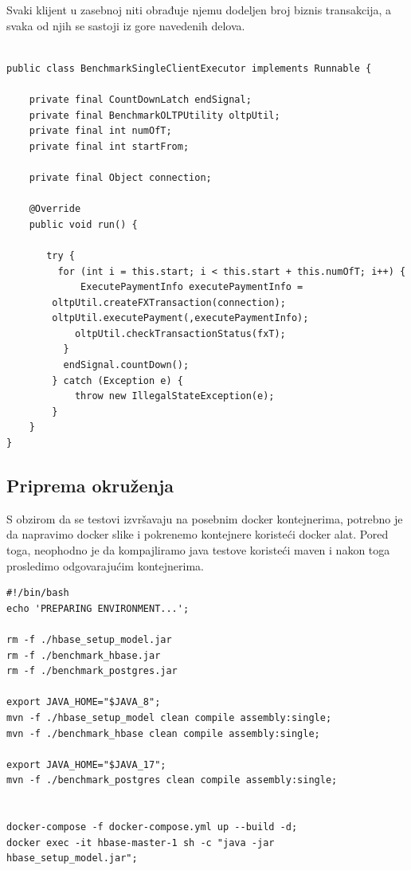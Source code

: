 \documentclass[12pt,oneside]{memoir}
\begin{document}
Svaki klijent u zasebnoj niti obrađuje njemu dodeljen broj biznis transakcija, a svaka od njih se sastoji iz gore navedenih delova.


\begin{lstlisting}[title={BenchmarkSingleClientExecutor.java},captionpos=t]

public class BenchmarkSingleClientExecutor implements Runnable {

    private final CountDownLatch endSignal;
    private final BenchmarkOLTPUtility oltpUtil;
    private final int numOfT;
    private final int startFrom;

    private final Object connection;

    @Override
    public void run() {

       try {
         for (int i = this.start; i < this.start + this.numOfT; i++) {
             ExecutePaymentInfo executePaymentInfo = 
	    oltpUtil.createFXTransaction(connection);
	    oltpUtil.executePayment(,executePaymentInfo);
            oltpUtil.checkTransactionStatus(fxT);
          }
          endSignal.countDown();
        } catch (Exception e) {
            throw new IllegalStateException(e);
        }
    }
}

\end{lstlisting}



\subsection{Priprema okruženja}

S obzirom da se testovi izvršavaju na posebnim docker kontejnerima, potrebno  je da napravimo docker slike i pokrenemo kontejnere koristeći docker alat. Pored toga, neophodno je da kompajliramo java testove koristeći maven i nakon toga  prosledimo  odgovarajućim  kontejnerima.


\begin{lstlisting}[title={prepareEnv.sh},captionpos=t]
#!/bin/bash
echo 'PREPARING ENVIRONMENT...';

rm -f ./hbase_setup_model.jar
rm -f ./benchmark_hbase.jar
rm -f ./benchmark_postgres.jar

export JAVA_HOME="$JAVA_8";
mvn -f ./hbase_setup_model clean compile assembly:single;
mvn -f ./benchmark_hbase clean compile assembly:single;

export JAVA_HOME="$JAVA_17";
mvn -f ./benchmark_postgres clean compile assembly:single;


docker-compose -f docker-compose.yml up --build -d;
docker exec -it hbase-master-1 sh -c "java -jar hbase_setup_model.jar";

\end{lstlisting}
\end{document}
